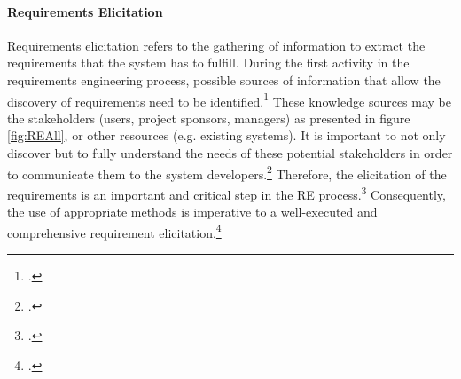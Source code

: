 \paragraph{Requirements Elicitation} Requirements elicitation refers to the gathering of information to extract the requirements that the system has to fulfill. During the first activity in the requirements engineering process, possible sources of information that allow the discovery of requirements need to be identified.\footcite[Cf.][p.17]{SommervilleIntegratedrequirementsengineering2005} These knowledge sources may be the stakeholders (users, project sponsors, managers) as presented in figure \ref{fig:REAll}, or other resources (e.g. existing systems). It is important to not only discover but to fully understand the needs of these potential stakeholders in order to communicate them to the system developers.\footcite[Cf.][p.21]{ZowghiRequirementselicitationsurvey2005} Therefore, the elicitation of the requirements is an important and critical step in the RE process.\footcites[Cf.][p.232]{ZhangEffectiverequirementsdevelopmentA2007}[cf.][p.19]{ZowghiRequirementselicitationsurvey2005} Consequently, the use of appropriate methods is imperative to a well-executed and comprehensive requirement elicitation.\footcite[Cf.][p.232]{ZhangEffectiverequirementsdevelopmentA2007}






